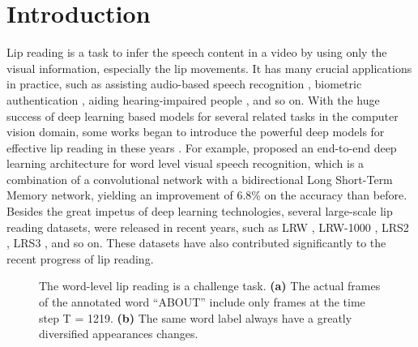 \documentclass[a4paper, 10pt, conference]{ieeeconf}      \usepackage{FG2020}
\begin{document}
\section{Introduction}
Lip reading is a task to infer the speech content in a video by using only the visual information, especially the lip movements. It has many crucial applications in practice, such as assisting audio-based speech recognition \cite{chen1998audio}, biometric authentication \cite{assael2016lipnet}, aiding hearing-impaired people \cite{xu2018lcanet}, and so on. With the huge success of deep learning based models for several related tasks in the computer vision domain, some works began to introduce the powerful deep models for effective lip reading in these years \cite{assael2016lipnet,stafylakis2017combining,stafylakis2018pushing,petridis2018end}. For example, \cite{stafylakis2017combining} proposed an end-to-end deep learning architecture for word level visual speech recognition, which is a combination of a convolutional network with a  bidirectional Long Short-Term Memory network, yielding an improvement of 6.8\% on the accuracy than before. Besides the great impetus of deep learning technologies, several large-scale lip reading datasets, were released in recent years, such as LRW \cite{chung2016lip}, LRW-1000 \cite{yang2018lrw}, LRS2 \cite{chung2017lip}, LRS3 \cite{afouras2018lrs3}, and so on. These datasets have also contributed significantly to the recent progress of lip reading.
\begin{figure}[t]
\centering
{}
\caption {The word-level lip reading is a challenge task. \textbf{(a)} The actual frames of the annotated word ``ABOUT'' include only frames at the time step T = 1219. \textbf{(b)} The same word label always have a greatly diversified appearances changes.}
\label{new_fig1} \end{figure}
\end{document}
